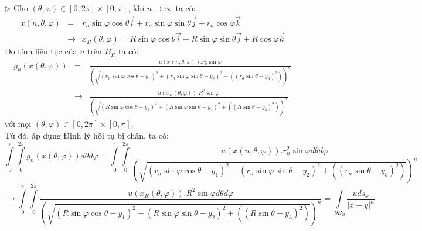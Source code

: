 $\triangleright$ Cho $
\left( {\theta ,\varphi } \right) \in \left[ {0,2\pi } \right] \times \left[ {0,\pi } \right]
$, khi $
n \to \infty 
$ ta có:
\begin{eqnarray}
x\left( {n,\theta ,\varphi } \right) &=& r_n \sin \varphi \cos \theta \overrightarrow i  + r_n \sin \varphi \sin \theta \overrightarrow j  + r_n \cos \varphi \overrightarrow k \nonumber\\
& \to & x_R \left( {\theta ,\varphi } \right) = R\sin \varphi \cos \theta \overrightarrow i  + R\sin \varphi \sin \theta \overrightarrow j  + R\cos \varphi \overrightarrow k \nonumber
\end{eqnarray}
Do tính liên tục của $u$ trên $B_R$ ta có:
\begin{eqnarray}
g_n \left( {x\left( {\theta ,\varphi } \right)} \right)& = &\frac{{u\left( {x\left( {n,\theta ,\varphi } \right)} \right).r_n^2 \sin \varphi }}
{{\left( {\sqrt {\left( {r_n \sin \varphi \cos \theta  - y_1 } \right)^2  + \left( {r_n \sin \varphi \sin \theta  - y_2 } \right)^2  + \left( {\left( {r_n \sin \theta  - y_3 } \right)^2 } \right)} } \right)^n }}\nonumber\\
 &\to & \frac{{u\left( {x_R \left( {\theta ,\varphi } \right)} \right).R^2 \sin \varphi }}
{{\left( {\sqrt {\left( {R\sin \varphi \cos \theta  - y_1 } \right)^2  + \left( {R\sin \varphi \sin \theta  - y_2 } \right)^2  + \left( {\left( {R\sin \theta  - y_3 } \right)^2 } \right)} } \right)^n }}\nonumber
\end{eqnarray}
với mọi $
\left( {\theta ,\varphi } \right) \in \left[ {0,2\pi } \right] \times \left[ {0,\pi } \right]$.\\
Từ đó, áp dụng Định lý hội tụ bị chận, ta có:
\[
\int\limits_0^\pi  {\int\limits_0^{2\pi } {g_n \left( {x\left( {\theta ,\varphi } \right)} \right)d\theta d\varphi } }  = \int\limits_0^\pi  {\int\limits_0^{2\pi } {\frac{{u\left( {x\left( {n,\theta ,\varphi } \right)} \right).r_n^2 \sin \varphi d\theta d\varphi }}
{{\left( {\sqrt {\left( {r_n \sin \varphi \cos \theta  - y_1 } \right)^2  + \left( {r_n \sin \varphi \sin \theta  - y_2 } \right)^2  + \left( {\left( {r_n \sin \theta  - y_3 } \right)^2 } \right)} } \right)^n }}} } 
\]
\[
 \to \int\limits_0^\pi  {\int\limits_0^{2\pi } {\frac{{u\left( {x_R \left( {\theta ,\varphi } \right)} \right).R^2 \sin \varphi d\theta d\varphi }}
{{\left( {\sqrt {\left( {R\sin \varphi \cos \theta  - y_1 } \right)^2  + \left( {R\sin \varphi \sin \theta  - y_2 } \right)^2  + \left( {\left( {R\sin \theta  - y_3 } \right)^2 } \right)} } \right)^n }}} }  = \int\limits_{\partial B_R } {\frac{{uds_x }}
{{\left| {x - y} \right|^n }}} 
\]
